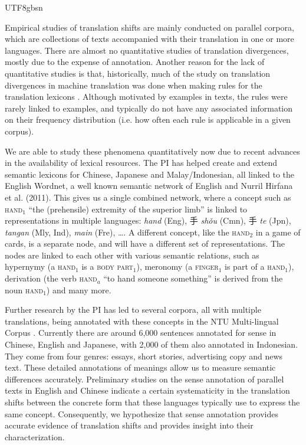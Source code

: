 \documentclass[12pt]{book} %
\newcommand{\eng}[1]{\textit{#1}}
\newcommand{\cmn}[1]{\textit{#1}}
\newcommand{\fre}[1]{\textit{#1}}
\newcommand{\jpn}[1]{\textit{#1}}
\newcommand{\msa}[1]{\textit{#1}}
\begin{document}
\begin{CJK}{UTF8}{gbsn}
\begin{itemize}
\end{itemize}



Empirical studies of translation shifts are mainly conducted on
parallel corpora, which are collections of texts accompanied with
their translation in one or more languages.  
There are almost no quantitative studies of translation divergences,
mostly due to the expense of annotation.  Another reason for the lack
of quantitative studies is that, historically, much of the study on
translation divergences in machine translation was done when making
rules for the translation lexicons \citep{Dorr:1993}.  Although
motivated by examples in texts, the rules were rarely linked to
examples, and typically do not have any associated information on
their frequency distribution (i.e. how often each rule is applicable
in a given corpus).

We are able to study these phenomena quantitatively now due to recent
advances in the availability of lexical resources.  The PI has helped
create and extend semantic lexicons for Chinese, Japanese and
Malay/Indonesian, all linked to the English Wordnet, a well known
semantic network of English
\citep{Xu:Gao:Qu:Huang:2008,Isahara:Bond:Uchimoto:Utiyama:Kanzaki:2008,_Fellbaum:1998}
and Nurril Hirfana et al. (2011).\nocite{Noor:Sapuan:Bond:2011} This
gives us a single combined network, where a concept such as
\textsc{hand$_1$} ``the (prehensile) extremity of the superior limb''
is linked to representations in multiple languages: \eng{hand} (Eng),
手 \cmn{sh\v{o}u} (Cmn), 手 \jpn{te} (Jpn), \msa{tangan} (Mly, Ind),
\fre{main} (Fre), \ldots \citep{Bond:Paik:2012}.  A different concept,
like the \textsc{hand$_2$} in a game of cards, is a separate node, and
will have a different set of representations.  The nodes are linked to
each other with various semantic relations, such as hypernymy (a
\textsc{hand$_1$} is a \textsc{body part$_1$}), meronomy (a
\textsc{finger$_1$} is part of a \textsc{hand$_1$}), derivation (the
verb \textsc{hand$_a$} ``to hand someone something'' is derived from
the noun \textsc{hand$_1$}) and many more.

Further research by the PI has led to several corpora, all with
multiple translations, being annotated with these concepts in the NTU
Multi-lingual Corpus \citep{Tan:Bond:2011}.  Currently there are around
6,000 sentences annotated for sense in Chinese, English and Japanese,
with 2,000 of them also annotated in Indonesian.  They come from four
genres: essays, short stories, advertising copy and news text.  These
detailed annotations of meanings allow us to measure semantic
differences accurately.  Preliminary studies on the sense annotation
of parallel texts in English and Chinese indicate a
certain systematicity in the translation shifts between the concrete
form that these languages typically use to express the same concept.
Consequently, we hypothesize that sense annotation provides accurate
evidence of translation shifts and provides insight into their
characterization.


\end{CJK}
\end{document}
